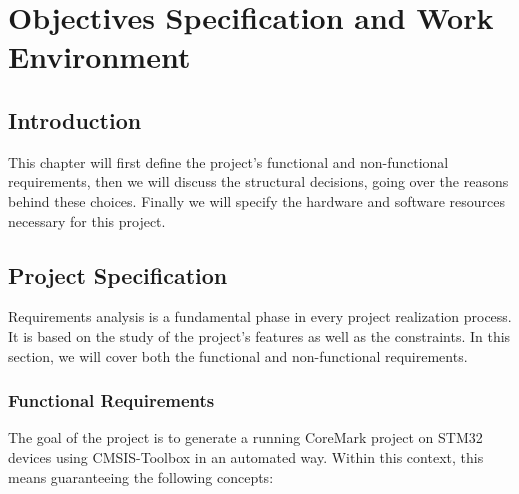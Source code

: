 \chapter{Objectives Specification and Work Environment}

\section*{Introduction}
This chapter will first define the project's functional and non-functional requirements, then we will discuss the structural decisions, going over the reasons behind these choices. Finally we will specify the hardware and software resources necessary for this project.

\section{Project Specification}
Requirements analysis is a fundamental phase in every project realization process. It is based on the study of the project's features as well as the constraints. In this section, we will cover both the functional and non-functional requirements.

\subsection{Functional Requirements}

The goal of the project is to generate a running CoreMark project on STM32 devices using CMSIS-Toolbox in an automated way. Within this context, this means guaranteeing the following concepts:

%

